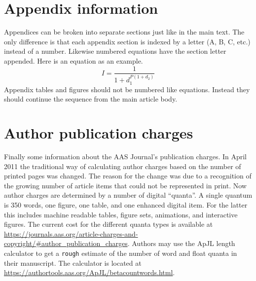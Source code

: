 \documentclass[linenumbers]{aastex631}
\begin{document}



\appendix

\section{Appendix information}

Appendices can be broken into separate sections just like in the main text.
The only difference is that each appendix section is indexed by a letter
(A, B, C, etc.) instead of a number.  Likewise numbered equations have
the section letter appended.  Here is an equation as an example.
\begin{equation}
I = \frac{1}{1 + d_{1}^{P (1 + d_{2} )}}
\end{equation}
Appendix tables and figures should not be numbered like equations. Instead
they should continue the sequence from the main article body.

\section{Author publication charges} \label{sec:pubcharge}

Finally some information about the AAS Journal's publication charges.
In April 2011 the traditional way of calculating author charges based on 
the number of printed pages was changed.  The reason for the change
was due to a recognition of the growing number of article items that could not 
be represented in print. Now author charges are determined by a number of
digital ``quanta''.  A single quantum is 350 words, one figure, one table,
and one enhanced digital item.  For the latter this includes machine readable
tables, figure sets, animations, and interactive figures.  The current cost
for the different quanta types is available at 
\url{https://journals.aas.org/article-charges-and-copyright/#author_publication_charges}. 
Authors may use the ApJL length calculator to get a {\tt rough} estimate of 
the number of word and float quanta in their manuscript. The calculator 
is located at \url{https://authortools.aas.org/ApJL/betacountwords.html}.
\end{document}
